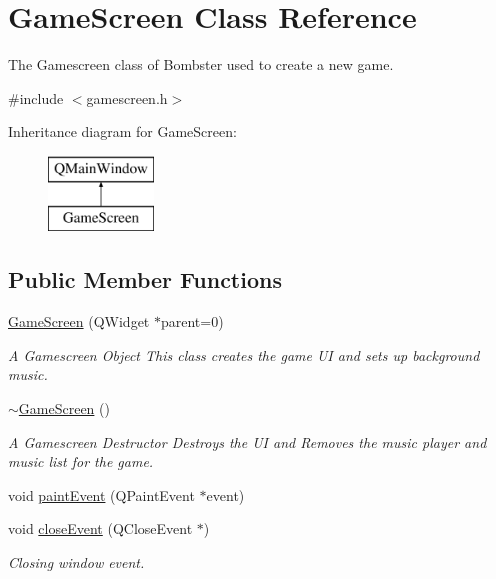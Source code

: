 \hypertarget{class_game_screen}{\section{Game\-Screen Class Reference}
\label{class_game_screen}
}


The Gamescreen class of Bombster used to create a new game.  




{\ttfamily \#include $<$gamescreen.\-h$>$}

Inheritance diagram for Game\-Screen\-:\begin{figure}[H]
\begin{center}
\leavevmode
\includegraphics[height=2.000000cm]{class_game_screen}
\end{center}
\end{figure}
\subsection*{Public Member Functions}
\begin{DoxyCompactItemize}
\item 
\hyperlink{class_game_screen_a61ac084a564d45be53337cc364214a60}{Game\-Screen} (Q\-Widget $\ast$parent=0)
\begin{DoxyCompactList}\small\item\em A Gamescreen Object This class creates the game U\-I and sets up background music. \end{DoxyCompactList}\item 
\hyperlink{class_game_screen_a0d25dfce42d72954aab40dbccbf1a0b1}{$\sim$\-Game\-Screen} ()
\begin{DoxyCompactList}\small\item\em A Gamescreen Destructor Destroys the U\-I and Removes the music player and music list for the game. \end{DoxyCompactList}\item 
void \hyperlink{class_game_screen_ab954f12aa342e80cb55dd4e2b8d3afeb}{paint\-Event} (Q\-Paint\-Event $\ast$event)
\item 
void \hyperlink{class_game_screen_af2a5d4c707d0d0f47201eec498b77bd6}{close\-Event} (Q\-Close\-Event $\ast$)
\begin{DoxyCompactList}\small\item\em Closing window event. \end{DoxyCompactList}\end{DoxyCompactItemize}
